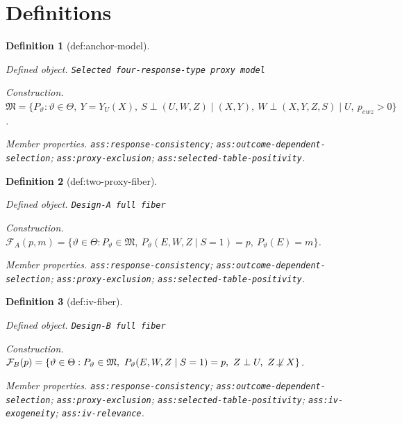 \documentclass{article}
\newtheorem{definition}{Definition}
\begin{document}
\section{Definitions}

\begin{definition}[def:anchor-model]\label{def:anchor-model}
\par\smallskip\noindent\emph{Defined object.} \texttt{Selected four-\allowbreak{}response-\allowbreak{}type proxy model}
\par\smallskip\noindent\emph{Construction.} \(\mathfrak M=\{P_{\vartheta}:\vartheta\in\Theta,\ Y=Y_U(X),\ S\perp(U,W,Z)\mid(X,Y),\ W\perp(X,Y,Z,S)\mid U,\ p_{ewz}>0\}\).
\par\smallskip\noindent\emph{Member properties.} \texttt{ass:\allowbreak{}response-\allowbreak{}consistency}; \texttt{ass:\allowbreak{}outcome-\allowbreak{}dependent-\allowbreak{}selection}; \texttt{ass:\allowbreak{}proxy-\allowbreak{}exclusion}; \texttt{ass:\allowbreak{}selected-\allowbreak{}table-\allowbreak{}positivity}.
\end{definition}

\begin{definition}[def:two-proxy-fiber]\label{def:two-proxy-fiber}
\par\smallskip\noindent\emph{Defined object.} \texttt{Design-\allowbreak{}A full fiber}
\par\smallskip\noindent\emph{Construction.} \(\mathcal F_A(p,m)=\{\vartheta\in\Theta:P_{\vartheta}\in\mathfrak M,\ P_{\vartheta}(E,W,Z\mid S=1)=p,\ P_{\vartheta}(E)=m\}\).
\par\smallskip\noindent\emph{Member properties.} \texttt{ass:\allowbreak{}response-\allowbreak{}consistency}; \texttt{ass:\allowbreak{}outcome-\allowbreak{}dependent-\allowbreak{}selection}; \texttt{ass:\allowbreak{}proxy-\allowbreak{}exclusion}; \texttt{ass:\allowbreak{}selected-\allowbreak{}table-\allowbreak{}positivity}.
\end{definition}

\begin{definition}[def:iv-fiber]\label{def:iv-fiber}
\par\smallskip\noindent\emph{Defined object.} \texttt{Design-\allowbreak{}B full fiber}
\par\smallskip\noindent\emph{Construction.} \(\mathcal F_B(p)=\{\vartheta\in\Theta:P_{\vartheta}\in\mathfrak M,\ P_{\vartheta}(E,W,Z\mid S=1)=p,\ Z\perp U,\ Z\not\!\perp X\}\).
\par\smallskip\noindent\emph{Member properties.} \texttt{ass:\allowbreak{}response-\allowbreak{}consistency}; \texttt{ass:\allowbreak{}outcome-\allowbreak{}dependent-\allowbreak{}selection}; \texttt{ass:\allowbreak{}proxy-\allowbreak{}exclusion}; \texttt{ass:\allowbreak{}selected-\allowbreak{}table-\allowbreak{}positivity}; \texttt{ass:\allowbreak{}iv-\allowbreak{}exogeneity}; \texttt{ass:\allowbreak{}iv-\allowbreak{}relevance}.
\end{definition}
\end{document}
